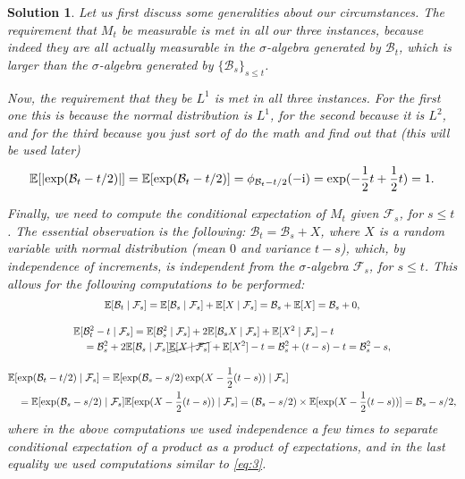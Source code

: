 \documentclass{article}
\theoremstyle{nonumberplain}
\newtheorem{sol}{Solution}
\newcommand{\I}{\mathrm{i}}
\DeclarePairedDelimiter{\abs}{\lvert}{\rvert}
\newcommand{\EV}{\mathbb{E}}
\newcommand{\Brwn}{\mathcal{B}}
\newcommand{\sa}[1]{\mathcal{#1}}
\begin{document}
\begin{sol}
Let us first discuss some generalities about our circumstances. The requirement that $M_t$ be measurable is met in all our three instances, because indeed they are all actually measurable in the $\sigma$-algebra generated by $\Brwn_t$, which is larger than the $\sigma$-algebra generated by $\{\Brwn_s\}_{s \leq t}$.

Now, the requirement that they be $L^1$ is met in all three instances. For the first one this is because the normal distribution is $L^1$, for the second because it is $L^2$, and for the third because you just sort of do the math and find out that (this will be used later)
\begin{equation}\label{eq:3}
\EV[\abs{\exp(\Brwn_t - t/2)}] = \EV[\exp(\Brwn_t - t/2)] = \phi_{\Brwn_t - t/2}(-\I) = \exp(-\frac12 t + \frac12 t) = 1.
\end{equation}

Finally, we need to compute the conditional expectation of $M_t$ given $\sa{F}_s$, for $s \leq t$. The essential observation is the following: $\Brwn_t = \Brwn_s + X$, where $X$ is a random variable with normal distribution (mean $0$ and variance $t-s$), which, by independence of increments, \emph{is independent from the $\sigma$-algebra $\sa{F}_s$,} for $s \leq t$. This allows for the following computations to be performed:
\begin{equation}
\begin{gathered}
\EV[\Brwn_t \mid \sa F_s] = \EV[\Brwn_s \mid \sa F_s] + \EV[X \mid \sa F_s] = \Brwn_s + \EV[X] = \Brwn_s + 0,\\[1em]
\begin{multlined}
\EV[\Brwn_t^2 - t \mid \sa F_s] = \EV[\Brwn_s^2  \mid \sa F_s] + 2 \EV[\Brwn_s X \mid \sa F_s] + \EV[X^2 \mid \sa F_s] - t\\
= \Brwn_s^2 + 2 \EV[\Brwn_s \mid \sa F_s] \cancel{\EV[X \mid \sa F_s]} + \EV[X^2] - t = \Brwn_s^2 + (t-s) - t = \Brwn_s^2 - s,\end{multlined}\\[1em]
\begin{multlined}
\EV[\exp(\Brwn_t - t/2)\mid \sa F_s] = \EV[\exp(\Brwn_s - s/2) \exp(X - \frac12(t-s)) \mid \sa F_s] \\
= \EV[\exp(\Brwn_s - s/2) \mid \sa F_s] \EV[\exp(X - \frac12(t-s)) \mid \sa F_s] = (\Brwn_s - s/2) \times\EV[\exp(X - \frac12(t-s))] = \Brwn_s - s/2,
\end{multlined}
\end{gathered}
\end{equation}
where in the above computations we used independence a few times to separate conditional expectation of a product as a product of expectations, and in the last equality we used computations similar to \eqref{eq:3}.
\end{sol}
\end{document}
